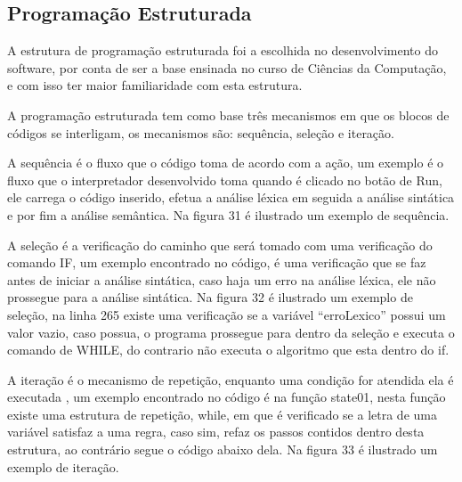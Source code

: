 \documentclass[12pt,oneside,a4paper,chapter=TITLE,section=TITLE,sumario=tradicional]{abntex2}
\begin{document}
\subsection{Programação Estruturada}
\label{subsec:programacaoestruturada}

A estrutura de programação estruturada foi a escolhida no desenvolvimento do software, por conta de ser a base ensinada no curso de Ciências da Computação, e com isso ter maior familiaridade com esta estrutura.

A programação estruturada tem como base três mecanismos em que os blocos de códigos se interligam, os mecanismos são: sequência, seleção e iteração\cite{ivan2003}.

A sequência é o fluxo que o código toma de acordo com a ação\cite{ivan2003}, um exemplo é o fluxo que o interpretador desenvolvido toma quando é clicado no botão de Run, ele carrega o código inserido, efetua a análise léxica em seguida a análise sintática e por fim a análise semântica. Na figura 31 é ilustrado um exemplo de sequência.

\begin{figure}[htb]
\end{figure}

A seleção é a verificação do caminho que será tomado com uma verificação do comando IF\cite{ivan2003}, um exemplo encontrado no código, é uma verificação que se faz antes de iniciar a análise sintática, caso haja um erro na análise léxica, ele não prossegue para a análise sintática. Na figura 32 é ilustrado um exemplo de seleção, na linha 265 existe uma verificação se a variável “erroLexico” possui um valor vazio, caso possua, o programa prossegue para dentro da seleção e executa o comando de WHILE, do contrario não executa o algoritmo que esta dentro do if.

\begin{figure}[htb]
\end{figure}

A iteração é o mecanismo de repetição, enquanto uma condição for atendida ela é executada \cite{ivan2003}, um exemplo encontrado no código é na função state01, nesta função existe uma estrutura de repetição, while, em que é verificado se a letra de uma variável satisfaz a uma regra, caso sim, refaz os passos contidos dentro desta estrutura, ao contrário segue o código abaixo dela. Na figura 33 é ilustrado um exemplo de iteração.
\end{document}
